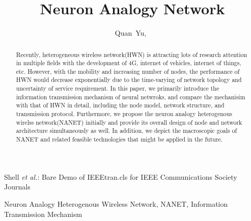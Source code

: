 \documentclass[journal,comsoc]{IEEEtran}
\begin{document}
	
	\title{Neuron Analogy Network}

	\author{Quan~Yu,~}
		

	{Shell \MakeLowercase{\textit{et al.}}: Bare Demo of IEEEtran.cls for IEEE Communications Society Journals}
	
	\maketitle
	
	\begin{abstract}
		Recently, heterogeneous wireless network(HWN) is attracting lots of research attention in multiple fields with the development of 4G, internet of vehicles, internet of things, etc. 
		However, with the mobility and increasing number of nodes, the performance of HWN would decrease exponentially due to the time-varying of network topology and uncertainty of service requirement. 
		In this paper, we primarily introduce the information transmission mechanism of neural netwroks, 
		and compare the mechanisim with that of HWN in detail, 
		including the node model, network structure, and transmission protocol. 
		Furthermore, we propose the neuron analogy heterogenous wirelss network(NANET) initially and provide its overall design of node and network architecture simultaneously as well.
		In addition, we depict the macroscopic goals of NANET  and related feasible technologies that might be applied in the future.
	\end{abstract}
	
	\begin{IEEEkeywords}
		Neuron Analogy Heterogenous Wireless Network, NANET, 
		Information Transmission Mechanism
	\end{IEEEkeywords}
	
\end{document}
